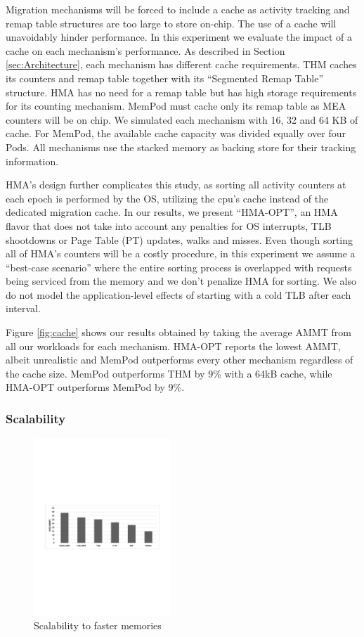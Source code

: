 Migration mechanisms will be forced to include a cache as activity tracking and remap table structures are too large to store on-chip. The use of a cache will unavoidably hinder performance. In this experiment we evaluate the impact of a cache on each mechanism's performance. As described in Section \ref{sec:Architecture}, each mechanism has different cache requirements. THM caches its counters and remap table together with its ``Segmented Remap Table'' structure. HMA has no need for a remap table but has high storage requirements for its counting mechanism. MemPod must cache only its remap table as MEA counters will be on chip. We simulated each mechanism with 16, 32 and 64 KB of cache. For MemPod, the available cache capacity was divided equally over four Pods. All mechanisms use the stacked memory as backing store for their tracking information.

HMA's design further complicates this study, as sorting all activity counters at each epoch is performed by the OS, utilizing the cpu's cache instead of the dedicated migration cache. In our results, we present ``HMA-OPT'', an HMA flavor that does not take into account any penalties for OS interrupts, TLB shootdowns or Page Table (PT) updates, walks and misses. Even though sorting all of HMA's counters will be a costly procedure, in this experiment we assume a ``best-case scenario'' where the entire sorting process is overlapped with requests being serviced from the memory and we don't penalize HMA for sorting. We also do not model the application-level effects of starting with a cold TLB after each interval.

Figure \ref{fig:cache} shows our results obtained by taking the average AMMT from all our workloads for each mechanism. HMA-OPT reports the lowest AMMT, albeit unrealistic and MemPod outperforms every other mechanism regardless of the cache size. MemPod outperforms THM by 9\% with a 64kB cache, while HMA-OPT outperforms MemPod by 9\%.

\subsubsection{Scalability}

\begin{figure}
  \includegraphics[width=0.46\textwidth]{figures/scalability.pdf}
  \caption{Scalability to faster memories}
  \label{fig:scalability}
\end{figure}

